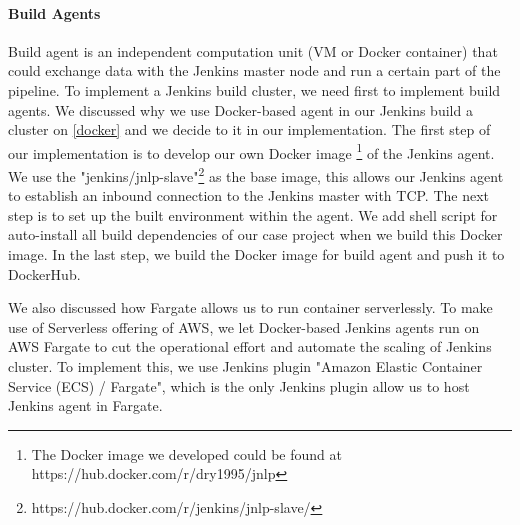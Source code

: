 \paragraph[]{Build Agents}
Build agent is an independent computation unit (VM or Docker container) that could exchange data with the Jenkins master node and run a certain part of the pipeline. To implement a Jenkins build cluster, we need first to implement build agents.
We discussed why we use Docker-based agent in our Jenkins build a cluster on \ref{docker} and we decide to it in our implementation. The first step of our implementation is to develop our own Docker image \footnote{The Docker image we developed could be found at https://hub.docker.com/r/dry1995/jnlp} of the Jenkins agent. We use the "jenkins/jnlp-slave"\footnote{https://hub.docker.com/r/jenkins/jnlp-slave/} as the base image, this allows our Jenkins agent to establish an inbound connection to the Jenkins master with TCP. The next step is to set up the built environment within the agent. We add shell script for auto-install all build dependencies of our case project when we build this Docker image. In the last step, we build the Docker image for build agent and push it to DockerHub. 
\par
We also discussed how Fargate allows us to run container serverlessly. To make use of Serverless offering of AWS, we let Docker-based Jenkins agents run on AWS Fargate to cut the operational effort and automate the scaling of Jenkins cluster. To implement this, we use Jenkins plugin "Amazon Elastic Container Service (ECS) / Fargate", which is the only Jenkins plugin allow us to host Jenkins agent in Fargate.  
